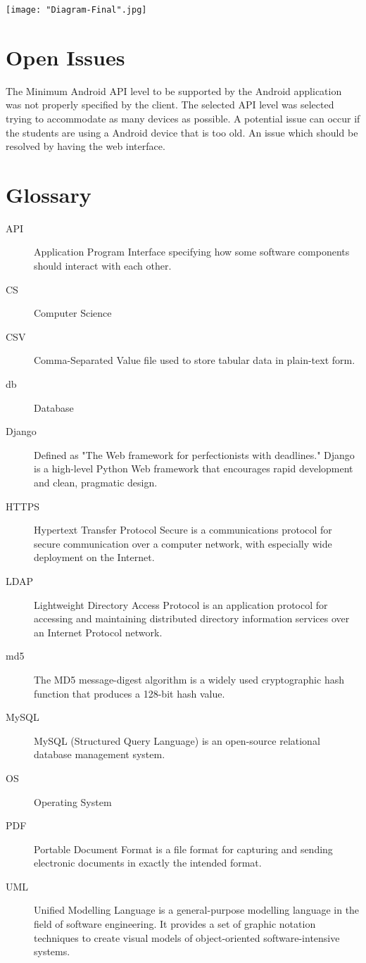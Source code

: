 \documentclass[10pt,a4paper]{article}
\begin{document}
\texttt{[image: "Diagram-Final".jpg]}

\section{Open Issues}
The Minimum Android API level to be supported by the Android application was not properly specified by the client. The selected API level was selected trying to accommodate as many devices as possible. A potential issue can occur if the students are using a Android device that is too old. An issue which should be resolved by having the web interface.
\section{Glossary}
\begin{description}
	\item[API] Application Program Interface specifying how some software components should interact with each other.
	\item[CS] Computer Science
	\item[CSV] Comma-Separated Value file used to store tabular data in plain-text form.
	\item[db] Database
	\item[Django] Defined as "The Web framework for perfectionists with deadlines." Django is a high-level Python Web framework that encourages rapid development and clean, pragmatic design.
	\item[HTTPS] Hypertext Transfer Protocol Secure is a communications protocol for secure communication over a computer network, with especially wide deployment on the Internet.
	\item[LDAP] Lightweight Directory Access Protocol  is an application protocol for accessing and maintaining distributed directory information services over an Internet Protocol network.
	\item[md5] The MD5 message-digest algorithm is a widely used cryptographic hash function that produces a 128-bit hash value.
	\item[MySQL] MySQL (Structured Query Language) is an open-source relational database management system.
	\item[OS] Operating System
	\item[PDF] Portable Document Format is a file format for capturing and sending electronic documents in exactly the intended format.
	\item[UML] Unified Modelling Language is a general-purpose modelling language in the field of software engineering. It provides a set of graphic notation techniques to create visual models of object-oriented software-intensive systems. 

\end{description}
\end{document}
